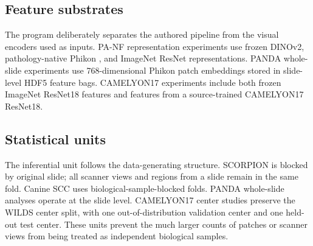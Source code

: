 \subsection{Feature substrates}
The program deliberately separates the authored pipeline from the visual encoders used as inputs. PA-NF representation experiments use frozen DINOv2, pathology-native Phikon \cite{filiot2023phikon}, and ImageNet ResNet representations. PANDA whole-slide experiments use 768-dimensional Phikon patch embeddings stored in slide-level HDF5 feature bags. CAMELYON17 experiments include both frozen ImageNet ResNet18 features and features from a source-trained CAMELYON17 ResNet18.

\subsection{Statistical units}
The inferential unit follows the data-generating structure. SCORPION is blocked by original slide; all scanner views and regions from a slide remain in the same fold. Canine SCC uses biological-sample-blocked folds. PANDA whole-slide analyses operate at the slide level. CAMELYON17 center studies preserve the WILDS center split, with one out-of-distribution validation center and one held-out test center. These units prevent the much larger counts of patches or scanner views from being treated as independent biological samples.
